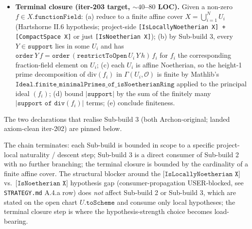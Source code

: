 \begin{itemize}
       \,\ggg\, \texttt{functionFieldIso}\)
    in \(\texttt{CommRingCat}\). Reference: Mathlib's
    \(\texttt{PresheafedSpace.stalkMap.stalkSpecializes\_stalkMap\_assoc}\)
    (\texttt{Geometry.RingedSpace.Stalks}). Naturality of
    \(\texttt{Scheme.RationalMap.order}\) across the stalk iso of
    Sub-build 1 follows by the resulting equation: for
    \(Y : X.\texttt{PrimeDivisor}\) with \(Y.\texttt{point} \in U\)
    and \(f \in X.\texttt{functionField}\),
    \(\texttt{order}\,Y\,f
     = \texttt{order}\,(\texttt{restrictToOpen}\,U\,Y\,h)\,f'\)
    with \(f'\) the image of \(f\) under
    \(X.\texttt{functionField} \simeq U.\texttt{toScheme}.\texttt{functionField}\).
    Direct consumer of Sub-build 2.
  \item \textbf{Terminal closure (iter-203 target, \(\sim 40\)--\(80\) LOC).}
    Given a non-zero \(f \in X.\texttt{functionField}\):
    (a) reduce to a finite affine cover \(X = \bigcup_{i = 1}^N U_i\)
    (Hartshorne II.6 hypothesis; project-side
    \texttt{[IsLocallyNoetherian X] + [CompactSpace X]} or just
    \texttt{[IsNoetherian X]}); (b) by Sub-build 3, every
    \(Y \in \texttt{support}\) lies in some \(U_i\) and has
    \(\texttt{order}\,Y\,f = \texttt{order}\,(\texttt{restrictToOpen}\,
     U_i\,Y\,h)\,f_i\) for \(f_i\) the corresponding fraction-field
    element on \(U_i\); (c) each \(U_i\) is affine Noetherian, so the
    height-1 prime decomposition of \(\mathrm{div}(f_i)\) in
    \(\Gamma(U_i, \mathcal O)\) is finite by Mathlib's
    \(\texttt{Ideal.finite\_minimalPrimes\_of\_isNoetherianRing}\)
    applied to the principal ideal \((f_i)\); (d) bound
    \(|\texttt{support}|\) by the sum of the finitely many
    \(|\texttt{support of div}(f_i)|\) terms; (e) conclude finiteness.
\end{itemize}

The two declarations that realise Sub-build 3 (both
Archon-original; landed axiom-clean iter-202) are pinned below.


The chain terminates: each Sub-build is bounded in scope to a
specific project-local naturality / descent step; Sub-build 3 is a
direct consumer of Sub-build 2 with no further branching; the
terminal closure is bounded by the cardinality of a finite affine
cover. The structural blocker around the
\(\texttt{[IsLocallyNoetherian X]}\) vs.\
\(\texttt{[IsNoetherian X]}\) hypothesis gap (consumer-propagation
USER-blocked, see \texttt{STRATEGY.md} A.4.a row) does \emph{not}
affect Sub-build 2 or Sub-build 3, which are stated on the open
chart \(U.\texttt{toScheme}\) and consume only local hypotheses; the
terminal closure step is where the hypothesis-strength choice
becomes load-bearing.
